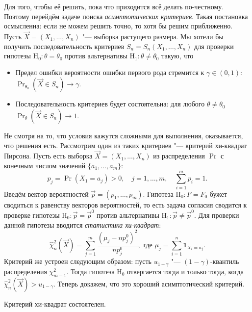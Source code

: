 Для того, чтобы её решить, пока что приходится всё делать по-честному. Поэтому перейдём задаче поиска \emph{асимптотических критериев}. Такая постановка осмысленна: если не можем решить точно, то хотя бы решим приближенно. Пусть $\vec{X} = (X_{1}, \ldots, X_{n})$ "--- выборка растущего размера. Мы хотели бы получить последовательность критериев $S_{n} = S_{n}(X_{1}, \ldots, X_{n})$ для проверки гипотезы $\mathrm{H}_{0} \colon \theta = \theta_{0}$ против альтернативы $\mathrm{H}_{1} \colon \theta \neq \theta_{0}$ такую, что
\begin{itemize}
	\item Предел ошибки вероятности ошибки первого рода стремится к $\gamma \in (0, 1)$: $\Pr_{\theta_{0}}(\vec{X} \in S_{n}) \to \gamma$.
	\item Последовательность критериев будет состоятельна: для любого $\theta \neq \theta_{0}$ $\Pr_{\theta}(\vec{X} \in S_{n}) \to 1$.
\end{itemize}
Не смотря на то, что условия кажутся сложными для выполнения, оказывается, что решения есть. Рассмотрим один из таких критериев "--- критерий хи-квадрат Пирсона. Пусть есть выборка $\vec{X} = (X_{1}, \ldots, X_{n})$ из распределения $\Pr$ с конечным числом значений $\{a_{1}, \ldots, a_{m}\}$:
\begin{equation}
	p_{j} = \Pr(X_{1} = a_{j}) > 0, \quad j = 1, \ldots, m, \quad \sum_{i = 1}^{m} p_{i} = 1.
\end{equation}
Введём вектор вероятностей $\vec{p} = (p_{1}, \ldots, p_{m})$. Гипотеза $\mathrm{H}_{0} \colon F = F_{0}$ бужет сводиться к равенству векторов вероятностей, то есть задача согласия сводится к проверке гипотезы $\mathrm{H}_{0} \colon \vec{p} = \vec{p}^{0}$ против альтернативы $\mathrm{H}_{1} \colon \vec{p} \neq \vec{p}^{0}$. Для проверки данной гипотезы вводится \emph{статистика хи-квадрат}:
\begin{equation}
	\hat{\chi}^{2}_{n}(\vec{X}) = \sum_{j = 1}^{m} \frac{(\mu_{j} - np_{j}^{0})^{2}}{np_{j}^{0}}, \text{ где } \mu_{j} = \sum_{i = 1}^{n} \mathbf{1}_{X_{i} = a_{j}}.
\end{equation} 
Критерий же устроен следующим образом: пусть $u_{1 - \gamma}$ "--- $(1 - \gamma)$-квантиль распределения $\chi^{2}_{m - 1}$. Тогда гипотеза $\mathrm{H}_{0}$ отвергается тогда и только тогда, когда $\hat{\chi}^{2}_{n}(\vec{X}) > u_{1 - \gamma}$. Теперь докажем, что это хороший асимптотический критерий.
\begin{statement}
	Критерий хи-квадрат состоятелен.
\end{statement}
